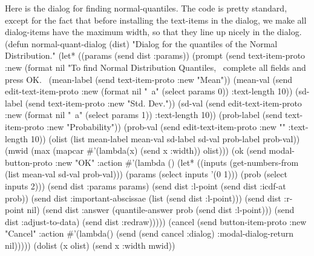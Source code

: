 Here is the dialog for finding normal-quantiles. The code is pretty
standard, except for the fact that before installing the text-items in
the dialog, we make all dialog-items have the maximum width, so that
they line up nicely in the dialog. 
\nwenddocs{}\plusendmoddef
(defun normal-quant-dialog (dist)
  "Dialog for the quantiles of the Normal Distribution."
  (let* ((params (send dist :params))
         (prompt (send text-item-proto :new
                  (format nil 
                    "To find Normal Distribution Quantiles,~%
                     complete all fields and press OK.~%
         (mean-label (send text-item-proto :new "Mean"))
         (mean-val (send edit-text-item-proto :new
                         (format nil "~a" (select params 0)) :text-length 10))
         (sd-label (send text-item-proto :new "Std. Dev."))
         (sd-val (send edit-text-item-proto :new
                       (format nil "~a" (select params 1)) :text-length 10))
         (prob-label (send text-item-proto :new "Probability"))
         (prob-val (send edit-text-item-proto :new "" :text-length 10))
         (olist (list mean-label mean-val sd-label sd-val 
                      prob-label prob-val))
         (mwid (max (mapcar #'(lambda(x) (send x :width)) olist)))
         (ok (send modal-button-proto :new "OK"
                   :action
                   #'(lambda ()
                      (let* ((inputs (get-numbers-from 
                                      (list mean-val sd-val prob-val)))
                             (params (select inputs '(0 1)))
                             (prob (select inputs 2)))
                         (send dist :params params)
                         (send dist :l-point (send dist :icdf-at prob))
                         (send dist :important-abscissae 
                               (list (send dist :l-point)))
                         (send dist :r-point nil)
                         (send dist :answer
                              (quantile-answer prob (send dist :l-point)))
                         (send dist :adjust-to-data)
                         (send dist :redraw)))))
         (cancel (send button-item-proto :new "Cancel"
                       :action
                       #'(lambda()
                           (send (send cancel :dialog)
                                 :modal-dialog-return nil)))))
    (dolist (x olist)
            (send x :width mwid))
